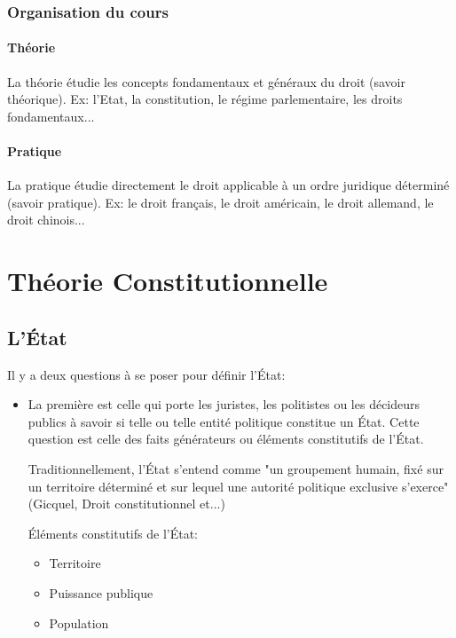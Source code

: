 ﻿\documentclass[12pt, a4paper, openany]{book}
\begin{document}
\begin{itemize}
	\section{Organisation du cours}
		\subsection{Théorie}
La théorie étudie les concepts fondamentaux et généraux du droit (savoir théorique). Ex: l'Etat, la constitution, le régime parlementaire, les droits fondamentaux...

		\subsection{Pratique}
La pratique étudie directement le droit applicable à un ordre juridique déterminé (savoir pratique). Ex: le droit français, le droit américain, le droit allemand, le droit chinois...




\part{Théorie Constitutionnelle}

\chapter{L'État}

Il y a deux questions à se poser pour définir l'État:
\begin{itemize}
\item La première est celle qui porte les juristes, les politistes ou les décideurs publics à savoir si telle ou telle entité politique constitue un État. Cette question est celle des faits générateurs ou éléments constitutifs de l'État. \newline

Traditionnellement, l'État s'entend comme "un groupement humain, fixé sur un territoire déterminé et sur lequel une autorité politique exclusive s'exerce" (Gicquel, Droit constitutionnel et...) \newline %

Éléments constitutifs de l'État:
\begin{itemize}
\item Territoire
\item Puissance publique
\item Population
\end{itemize}



\end{itemize}
\end{itemize}
\end{document}
